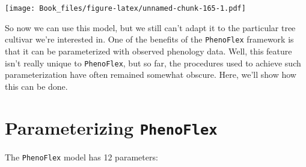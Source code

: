 \documentclass[
]{book}
\begin{document}
\texttt{[image: Book\_files/figure-latex/unnamed-chunk-165-1.pdf]}

So now we can use this model, but we still can't adapt it to the particular tree cultivar we're interested in. One of the benefits of the \texttt{PhenoFlex} framework is that it can be parameterized with observed phenology data. Well, this feature isn't really unique to \texttt{PhenoFlex}, but so far, the procedures used to achieve such parameterization have often remained somewhat obscure. Here, we'll show how this can be done.

\hypertarget{parameterizing-phenoflex}{%
\section{\texorpdfstring{Parameterizing \texttt{PhenoFlex}}{Parameterizing PhenoFlex}}\label{parameterizing-phenoflex}}

The \texttt{PhenoFlex} model has 12 parameters:
\end{document}
